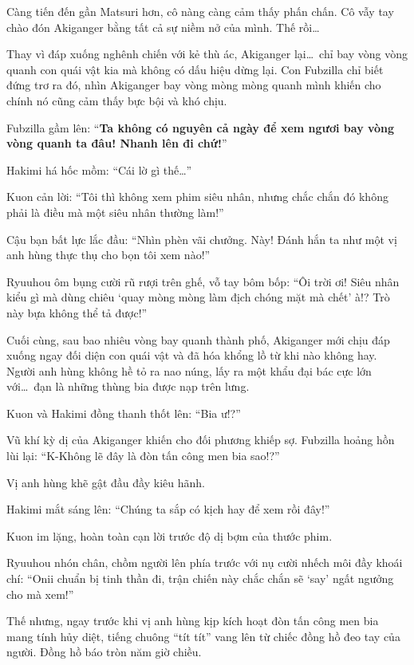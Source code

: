 \documentclass[../main.tex]{subfiles}
\begin{document}
Càng tiến đến gần Matsuri hơn, cô nàng càng cảm thấy phấn chấn. Cô vẫy tay chào đón Akiganger bằng tất cả sự niềm nở của mình. Thế rồi\dots

Thay vì đáp xuống nghênh chiến với kẻ thù ác, Akiganger lại\dots\ chỉ bay vòng vòng quanh con quái vật kia mà không có dấu hiệu dừng lại. Con Fubzilla chỉ biết đứng trơ ra đó, nhìn Akiganger bay vòng mòng mòng quanh mình khiến cho chính nó cũng cảm thấy bực bội và khó chịu.

Fubzilla gầm lên: ``\textbf{Ta không có nguyên cả ngày để xem ngươi bay vòng vòng quanh ta đâu! Nhanh lên đi chứ!}''


Hakimi há hốc mồm: ``Cái lờ gì thế\dots''

Kuon cản lời: ``Tôi thì không xem phim siêu nhân, nhưng chắc chắn đó không phải là điều mà một siêu nhân thường làm!''

Cậu bạn bất lực lắc đầu: ``Nhìn phèn vãi chưởng. Này! Đánh hắn ta như một vị anh hùng thực thụ cho bọn tôi xem nào!''

Ryuuhou ôm bụng cười rũ rượi trên ghế, vỗ tay bôm bốp: ``Ôi trời ơi! Siêu nhân kiểu gì mà dùng chiêu `quay mòng mòng làm địch chóng mặt mà chết' à!? Trò này bựa không thể tả được!''

Cuối cùng, sau bao nhiêu vòng bay quanh thành phố, Akiganger mới chịu đáp xuống ngay đối diện con quái vật và đã hóa khổng lồ từ khi nào không hay. Người anh hùng không hề tỏ ra nao núng, lấy ra một khẩu đại bác cực lớn với\dots\ đạn là những thùng bia được nạp trên lưng.


Kuon và Hakimi đồng thanh thốt lên: ``Bia ư!?''

Vũ khí kỳ dị của Akiganger khiến cho đối phương khiếp sợ. Fubzilla hoảng hồn lùi lại: ``K-Không lẽ đây là đòn tấn công men bia sao!?''

Vị anh hùng khẽ gật đầu đầy kiêu hãnh.

Hakimi mắt sáng lên: ``Chúng ta sắp có kịch hay để xem rồi đây!''

Kuon im lặng, hoàn toàn cạn lời trước độ dị bợm của thước phim.

Ryuuhou nhón chân, chồm người lên phía trước với nụ cười nhếch môi đầy khoái chí: ``Onii chuẩn bị tinh thần đi, trận chiến này chắc chắn sẽ `say' ngất ngưởng cho mà xem!''

Thế nhưng, ngay trước khi vị anh hùng kịp kích hoạt đòn tấn công men bia mang tính hủy diệt, tiếng chuông ``tít tít'' vang lên từ chiếc đồng hồ đeo tay của người. Đồng hồ báo tròn năm giờ chiều.
\end{document}
